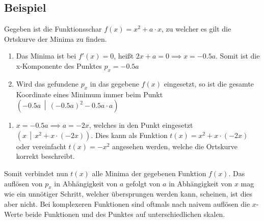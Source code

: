 \documentclass{article}
\begin{document}
\subsection{Beispiel}
Gegeben ist die Funktionsschar $f(x)=x^2+a \cdot x$, zu welcher es gilt die Ortskurve der Minima zu finden. 
\begin{enumerate}
 \item Das Minima ist bei $f'(x)=0$, heißt $2x+a=0 \implies x=-0.5a$. Somit ist die x-Komponente des Punktes $p_x=-0.5a$
 \item Wird das gefundene $p_x$ in das gegebene $f(x)$ eingesetzt, so ist die gesamte Koordinate eines Minimum immer beim Punkt $\left(-0.5a \,\middle|\, \left(-0.5a\right)^2-0.5a \cdot a\right)$
\end{enumerate}
  
\noindent \begin{minipage}[t]{\dimexpr\textwidth-5cm} 
 \begin{enumerate} 
 \item[3.] $x = -0.5a \implies a = -2x$, welches in den Punkt eingesetzt $\left(x \,\middle|\, x^2+x \cdot \left(-2x\right)\right)$. Dies kann als Funktion $t(x)=x^2+x \cdot (-2x)$ oder vereinfacht $t(x)=-x^2$ angesehen werden, welche die Ortskurve korrekt beschreibt.
 \end{enumerate}
 Somit verbindet nun $t(x)$ alle Minima der gegebenen Funktion $f(x)$. \newline
 Das auflösen von $p_x$ in Abhängigkeit von  $a$ gefolgt von $a$ in Abhängigkeit von $x$ mag wie ein unnötiger Schritt, welcher übersprungen werden kann, scheinen, ist dies aber nicht. Bei komplexeren Funktionen sind oftmals nach naivem auflösen die $x$-Werte beide Funktionen und des Punktes auf unterschiedlichen skalen.
\end{minipage} 
\hfill 
\end{document}
